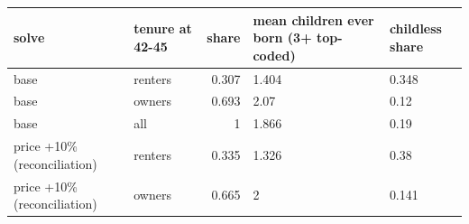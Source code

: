 \begingroup\small
\setlength{\tabcolsep}{3pt}
\renewcommand{\arraystretch}{1.04}
\begin{tabularx}{\linewidth}{XXrXX}
\toprule
solve & tenure at 42-45 & share & mean children ever born (3+ top-coded) & childless share \\
\midrule
base & renters & 0.307 & 1.404 & 0.348 \\
base & owners & 0.693 & 2.07 & 0.12 \\
base & all & 1 & 1.866 & 0.19 \\
price +10\% (reconciliation) & renters & 0.335 & 1.326 & 0.38 \\
price +10\% (reconciliation) & owners & 0.665 & 2 & 0.141 \\
\bottomrule
\end{tabularx}
\endgroup
